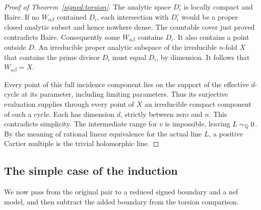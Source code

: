 \begin{proof}[Proof of Theorem~\ref{signed:torsion}]
The analytic space \(D_i^\circ\) is locally compact and
Baire.  If no \(W_{\alpha\beta}\) contained \(D_i\), each
intersection with \(D_i^\circ\) would be a proper closed
analytic subset and hence nowhere dense.  The countable
cover just proved contradicts Baire.  Consequently some
\(W_{\alpha\beta}\) contains \(D_i\).  It also contains a
point outside \(D\).  An irreducible proper analytic
subspace of the irreducible \(n\)-fold \(X\) that contains
the prime divisor \(D_i\) must equal \(D_i\), by dimension.
It follows that \(W_{\alpha\beta}=X\).

Every point of this full incidence component lies on the
support of the effective \(d\)-cycle at its parameter,
including limiting parameters.  Thus its surjective
evaluation supplies through every point of \(X\) an
irreducible compact component of such a cycle.  Each has
dimension \(d\), strictly between zero and \(n\).  This
contradicts simplicity.  The intermediate range for \(v\)
is impossible, leaving \(L\sim_{\mathbb Q}0\).  By the meaning of
rational linear equivalence for the actual line \(L\), a
positive Cartier multiple is the trivial holomorphic line.
\end{proof}

\subsection{The simple case of the induction}

We now pass from the original pair to a reduced signed boundary and a nef
model, and then subtract the added boundary from the torsion comparison.

